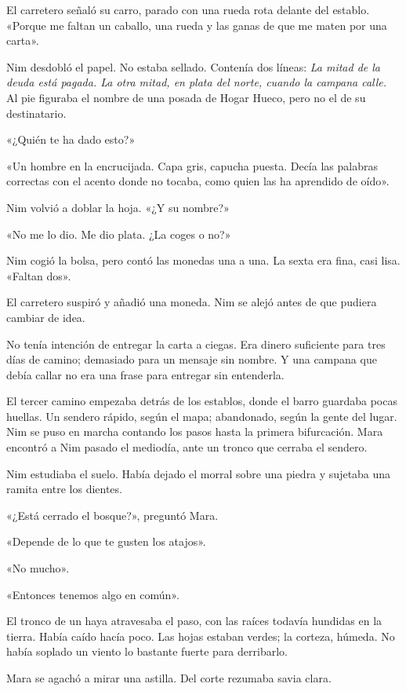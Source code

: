 \documentclass[10pt,a4paper]{article}
\begin{document}
El carretero señaló su carro, parado con una rueda rota delante del establo. «Porque me faltan un caballo, una rueda y las ganas de que me maten por una carta».

Nim desdobló el papel. No estaba sellado. Contenía dos líneas: \emph{La mitad de la deuda está pagada. La otra mitad, en plata del norte, cuando la campana calle.} Al pie figuraba el nombre de una posada de Hogar Hueco, pero no el de su destinatario.

«¿Quién te ha dado esto?»

«Un hombre en la encrucijada. Capa gris, capucha puesta. Decía las palabras correctas con el acento donde no tocaba, como quien las ha aprendido de oído».

Nim volvió a doblar la hoja. «¿Y su nombre?»

«No me lo dio. Me dio plata. ¿La coges o no?»

Nim cogió la bolsa, pero contó las monedas una a una. La sexta era fina, casi lisa. «Faltan dos».

El carretero suspiró y añadió una moneda. Nim se alejó antes de que pudiera cambiar de idea.

No tenía intención de entregar la carta a ciegas. Era dinero suficiente para tres días de camino; demasiado para un mensaje sin nombre. Y una campana que debía callar no era una frase para entregar sin entenderla.

El tercer camino empezaba detrás de los establos, donde el barro guardaba pocas huellas. Un sendero rápido, según el mapa; abandonado, según la gente del lugar. Nim se puso en marcha contando los pasos hasta la primera bifurcación.
Mara encontró a Nim pasado el mediodía, ante un tronco que cerraba el sendero.

Nim estudiaba el suelo. Había dejado el morral sobre una piedra y sujetaba una ramita entre los dientes.

«¿Está cerrado el bosque?», preguntó Mara.

«Depende de lo que te gusten los atajos».

«No mucho».

«Entonces tenemos algo en común».

El tronco de un haya atravesaba el paso, con las raíces todavía hundidas en la tierra. Había caído hacía poco. Las hojas estaban verdes; la corteza, húmeda. No había soplado un viento lo bastante fuerte para derribarlo.

Mara se agachó a mirar una astilla. Del corte rezumaba savia clara.
\end{document}
